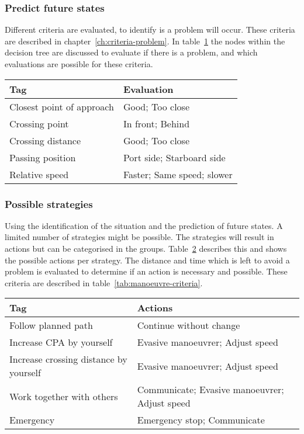 \subsubsection{Predict future states}
Different criteria are evaluated, to identify is a problem will occur. These criteria are described in chapter~\ref{ch:criteria-problem}. In table~\ref{tab:identification-criteria} the nodes within the decision tree are discussed to evaluate if there is a problem, and which evaluations are possible for these criteria. 
\begin{table}[H]
	\begin{tabular}{p{}|p{}}
		\toprule
		Tag & Evaluation \\
		\midrule
		Closest point of approach & Good; Too close \\
		Crossing point & In front; Behind \\
		Crossing distance & Good; Too close \\
		Passing position & Port side; Starboard side \\
		Relative speed & Faster; Same speed; slower \\
		\bottomrule
	\end{tabular}
	
	\label{tab:identification-criteria}
\end{table}

\subsubsection{Possible strategies}
Using the identification of the situation and the prediction of future states. A limited number of strategies might be possible. The strategies will result in actions but can be categorised in the groups. Table~\ref{tab:strategies} describes this and shows the possible actions per strategy. The distance and time which is left to avoid a problem is evaluated to determine if an action is necessary and possible. These criteria are described in table~\ref{tab:manoeuvre-criteria}.
\begin{table}[H]
	\begin{tabular}{p{}|p{}}
		\toprule
		Tag & Actions \\
		\midrule
		Follow planned path & Continue without change\\
		Increase CPA by yourself & Evasive manoeuvrer; Adjust speed \\
		Increase crossing distance by yourself & Evasive manoeuvrer; Adjust speed \\
		Work together with others & Communicate; Evasive manoeuvrer; Adjust speed \\
		Emergency & Emergency stop; Communicate \\
		\bottomrule
	\end{tabular}
	
	\label{tab:strategies}
\end{table}

